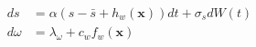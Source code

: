 \begin{align}
    ds &= \alpha(s-\bar{s}+h_w(\mathbf x)) dt + \sigma_s dW(t) \\
    d\omega &= \lambda_\omega + c_w f_w(\mathbf x)
\end{align}